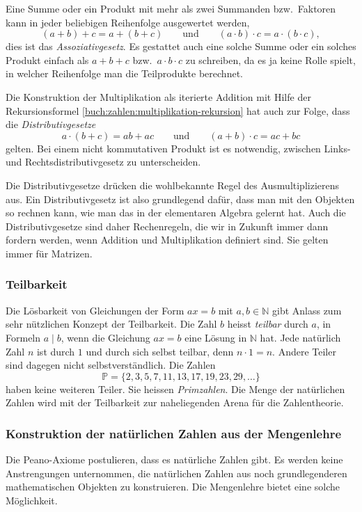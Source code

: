 Eine Summe oder ein Produkt mit mehr als zwei Summanden bzw.~Faktoren
kann in jeder beliebigen Reihenfolge ausgewertet werden,
\[
(a+b)+c
=
a+(b+c)
\qquad\text{und}\qquad
(a\cdot b)\cdot c
=
a\cdot (b\cdot c),
\]
dies ist das {\em Assoziativgesetz}.
Es gestattet auch eine solche Summe oder ein solches Produkt einfach
als $a+b+c$ bzw.~$a\cdot b\cdot c$ zu schreiben, da es ja keine Rolle
spielt, in welcher Reihenfolge man die Teilprodukte berechnet.

Die Konstruktion der Multiplikation als iterierte Addition mit Hilfe
der Rekursionsformel \eqref{buch:zahlen:multiplikation-rekursion}
hat auch zur Folge, dass die {\em Distributivgesetze}
%
\[
a\cdot(b+c) = ab+ac
\qquad\text{und}\qquad
(a+b)\cdot c = ac+bc
\]
gelten.
Bei einem nicht kommutativen Produkt ist es notwendig,
zwischen Links- und Rechtsdistributivgesetz zu unterscheiden.

Die Distributivgesetze drücken die wohlbekannte Regel des
Ausmultiplizierens aus.
Ein Distributivgesetz ist also grundlegend dafür, dass man mit den
Objekten so rechnen kann, wie man das in der elementaren Algebra 
gelernt hat.
Auch die Distributivgesetze sind daher Rechenregeln, die wir in
Zukunft immer dann fordern werden, wenn Addition und Multiplikation
definiert sind.
Sie gelten immer für Matrizen.

\subsubsection{Teilbarkeit}
Die Lösbarkeit von Gleichungen der Form $ax=b$ mit $a,b\in\mathbb{N}$
gibt Anlass zum sehr nützlichen Konzept der Teilbarkeit.
%
Die Zahl $b$ heisst {\em teilbar} durch $a$, in Formeln $a\mid b$,
wenn die Gleichung $ax=b$ eine Lösung in $\mathbb{N}$ hat.
%
Jede natürlich Zahl $n$ ist durch $1$ und durch sich selbst teilbar,
denn $n\cdot 1 = n$.
Andere Teiler sind dagegen nicht selbstverständlich.
Die Zahlen
\[
\mathbb{P}
=
\{2,3,5,7,11,13,17,19,23,29,\dots\}
\]
haben keine weiteren Teiler. Sie heissen {\em Primzahlen}.
%
Die Menge der natürlichen Zahlen wird mit der Teilbarkeit zur naheliegenden
Arena für die Zahlentheorie.
%

\subsubsection{Konstruktion der natürlichen Zahlen aus der Mengenlehre}
Die Peano-Axiome postulieren, dass es natürliche Zahlen gibt.
Es werden keine Anstrengungen unternommen, die natürlichen Zahlen
aus noch grundlegenderen mathematischen Objekten zu konstruieren.
Die Mengenlehre bietet eine solche Möglichkeit.

